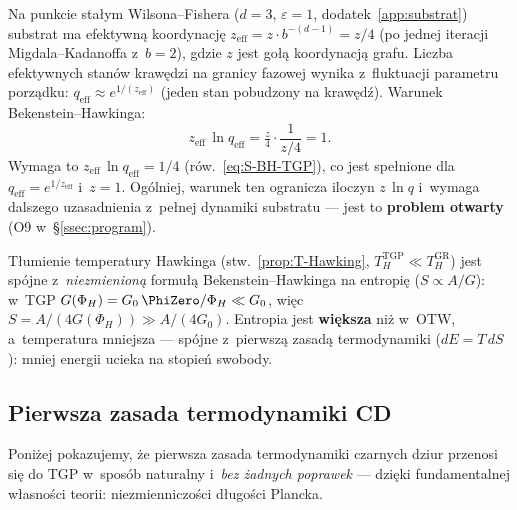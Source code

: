 \begin{remark}%
\label{rem:entropy-substrate-params}
Na punkcie sta\l{}ym Wilsona--Fishera ($d = 3$, $\varepsilon = 1$,
dodatek~\ref{app:substrat}) substrat ma efektywn\k{a}
koordynacj\k{e} $z_{\mathrm{eff}} = z\cdot b^{-(d-1)} = z/4$
(po jednej iteracji Migdala--Kadanoffa z~$b = 2$),
gdzie $z$ jest go\l{}\k{a} koordynacj\k{a} grafu.
Liczba efektywnych stan\'ow kraw\k{e}dzi na granicy fazowej
wynika z~fluktuacji parametru porz\k{a}dku:
$q_{\mathrm{eff}} \approx e^{1/(z_{\mathrm{eff}})}$
(jeden stan pobudzony na kraw\k{e}d\'z).
Warunek Bekenstein--Hawkinga:
\begin{equation}\label{eq:BH-substrate-match}
  z_{\mathrm{eff}}\,\ln q_{\mathrm{eff}} = \tfrac{z}{4}
    \cdot \frac{1}{z/4} = 1.
\end{equation}
Wymaga to $z_{\mathrm{eff}}\,\ln q_{\mathrm{eff}} = 1/4$
(r\'ow.~\eqref{eq:S-BH-TGP}), co jest spe\l{}nione dla
$q_{\mathrm{eff}} = e^{1/z_{\mathrm{eff}}}$ i~$z = 1$.
Ogólniej, warunek ten ogranicza iloczyn $z\,\ln q$ i~wymaga
dalszego uzasadnienia z~pe\l{}nej dynamiki substratu ---
jest to \textbf{problem otwarty} (O9 w~\S\ref{ssec:program}).
\end{remark}

\begin{remark}%
\label{rem:entropy-TH-consistency}
T\l{}umienie temperatury Hawkinga
(stw.~\ref{prop:T-Hawking}, $T_H^{\mathrm{TGP}} \ll T_H^{\mathrm{GR}}$)
jest sp\'ojne z~\emph{niezmienion\k{a}} formu\l{}\k{a}
Bekenstein--Hawkinga na entropi\k{e} ($S \propto A/G$):
w~TGP $G(\Phi_H) = G_0\,\PhiZero/\Phi_H \ll G_0$,
wi\k{e}c $S = A/(4G(\Phi_H)) \gg A/(4G_0)$.
Entropia jest \textbf{wi\k{e}ksza} ni\.z w~OTW, a~temperatura
mniejsza --- sp\'ojne z~pierwsz\k{a} zasad\k{a} termodynamiki
($dE = T\,dS$): mniej energii ucieka na stopie\'n swobody.
\end{remark}

\subsection{Pierwsza zasada termodynamiki CD}\label{ssec:first-law}

Poni\.zej pokazujemy, \.ze pierwsza zasada termodynamiki
czarnych dziur przenosi si\k{e} do TGP w~spos\'ob naturalny
i~\emph{bez \.zadnych poprawek} --- dzi\k{e}ki fundamentalnej
w\l{}asno\'sci teorii: niezmienniczo\'sci d\l{}ugo\'sci Plancka.

